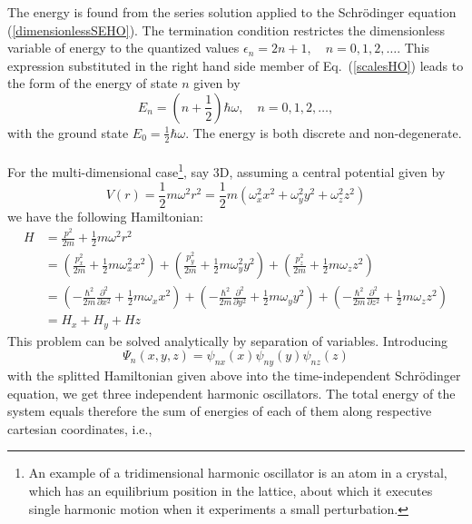 \noindent
The energy is found from the series solution applied to the Schr\"odinger equation (\ref{dimensionlessSEHO}). The termination condition restrictes the dimensionless variable of energy to the quantized values $\epsilon_n = 2n + 1, \quad n = 0, 1, 2, \ldots$. This expression substituted in the right hand side member of Eq.~(\ref{scalesHO}) leads to the form of the energy of state $n$ given by
$$
E_n = \left(n + \frac{1}{2}\right) \hbar \omega, \quad n=0,1,2,\ldots,
$$
with the ground state $E_0 = \frac{1}{2}\hbar \omega$. The energy is both discrete and non-degenerate.\\
\\
\noindent
For the multi-dimensional case\footnote{An example of a tridimensional harmonic oscillator is an atom in a crystal, which has an equilibrium position in the lattice, about which it executes single harmonic motion when it experiments a small perturbation\cite{Bohm}.}, say 3D, assuming a central potential given by
\begin{equation}\label{centralPotentialNoSymmetric}
V(r) = \frac{1}{2} m \omega^2 r^2 = \frac{1}{2} m (\omega_{x}^2 x^2 + \omega_{y}^2 y^2 + \omega_{z}^2 z^2)
\end{equation}
we have the following Hamiltonian:
\begin{align}\label{3DHamiltonianHO}
H &=\frac{p^2}{2m} + \frac{1}{2} m \omega^2 r^2\label{3DmomentumHamiltonian}\\ 
  & = \left(\frac{p_{x}^2}{2m} + \frac{1}{2} m \omega_{x}^2 x^2\right) + \left(\frac{p_{y}^2}{2m} + \frac{1}{2} m \omega_{y}^2 y^2\right) + \left(\frac{p_{z}^2}{2m} + \frac{1}{2} m \omega_{z} z^2\right)\nonumber\\
  & = \left(-\frac{\hbar^2}{2m}\frac{\partial^2}{\partial x^2}+\frac{1}{2}m \omega_{x} x^2\right) + \left(-\frac{\hbar^2}{2m}\frac{\partial^2}{\partial y^2}+\frac{1}{2}m \omega_{y} y^2\right) + \left(-\frac{\hbar^2}{2m}\frac{\partial^2}{\partial z^2}+\frac{1}{2}m \omega_{z} z^2\right) \nonumber\\
  & = H_x + H_y + Hz\label{splitteHamiltonian3DHO}
\end{align}
This problem can be solved analytically by separation of variables. Introducing 
\begin{equation}
 \Psi_n(x,y,z) = \psi_{nx}(x) \psi_{ny}(y) \psi_{nz}(z)
\end{equation}
with the splitted Hamiltonian given above into the time-independent Schr\"odinger equation, we get three independent harmonic oscillators. The total energy of the system equals therefore the sum of energies of each of them along respective cartesian coordinates, i.e.,
